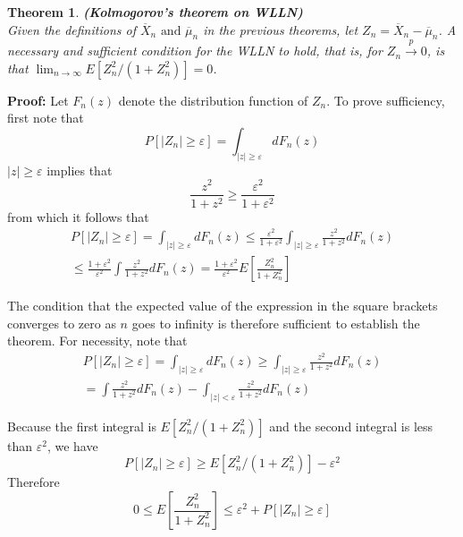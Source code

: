\documentclass{article}
\newtheorem{theorem}{Theorem}[section]
\begin{document}
\begin{theorem}
    \textbf{(Kolmogorov's theorem on WLLN)}\\
    Given the definitions of \(\overline{X}_n \text{ and } \overline{\mu}_n\) in the previous theorems, let \(Z_n=\overline{X}_n-\overline{\mu}_n\). A necessary and sufficient condition for the WLLN to hold, that is, for \(Z_n \stackrel{p} \longrightarrow 0\), is that \(\lim_{n \rightarrow \infty} E[Z_n^2/(1+Z_n^2)]=0\).
\end{theorem}

\textbf{Proof:} Let \(F_n(z)\) denote the distribution function of \(Z_n\). To prove sufficiency, first note that
\begin{equation*}
    P[|Z_n| \geq \varepsilon] = \int_{|z| \geq \varepsilon} dF_n(z)
\end{equation*}
\(|z| \geq \varepsilon\) implies that
\begin{equation*}
    \frac{z^2}{1+z^2} \geq \frac{\varepsilon^2}{1+\varepsilon^2}
\end{equation*}
from which it follows that
\begin{equation*}
    \begin{split}
        P[|Z_n| \geq \varepsilon] = \int_{|z| \geq \varepsilon} dF_n(z) \leq \frac{\varepsilon^2}{1+\varepsilon^2} \int_{|z| \geq \varepsilon} \frac{z^2}{1+z^2} dF_n(z) \\
        \leq \frac{1+\varepsilon^2}{\varepsilon^2} \int \frac{z^2}{1+z^2} dF_n(z) = \frac{1+\varepsilon^2}{\varepsilon^2}E\left[\frac{Z_n^2}{1+Z_n^2}\right]
    \end{split}
\end{equation*}

The condition that the expected value of the expression in the square brackets converges to zero as $n$ goes to infinity is therefore sufficient to establish the theorem. For necessity, note that
\begin{equation*}
    \begin{split}
        P[|Z_n| \geq \varepsilon] = \int_{|z| \geq \varepsilon} dF_n(z) \geq \int_{|z| \geq \varepsilon} \frac{z^2}{1+z^2} dF_n(z) \\
        = \int \frac{z^2}{1+z^2} dF_n(z)-\int_{|z|<\varepsilon} \frac{z^2}{1+z^2} dF_n(z)
    \end{split}
\end{equation*}

Because the first integral is \(E[Z_n^2/(1+Z_n^2)]\) and the second integral is less than \(\varepsilon^2\), we have
\begin{equation*}
    P[|Z_n| \geq \varepsilon] \geq E[Z_n^2/(1+Z_n^2)]-\varepsilon^2
\end{equation*}
Therefore
\begin{equation*}
    0 \leq E \left[\frac{Z_n^2}{1+Z_n^2}\right] \leq \varepsilon^2+P[|Z_n| \geq \varepsilon]
\end{equation*}
\end{document}
